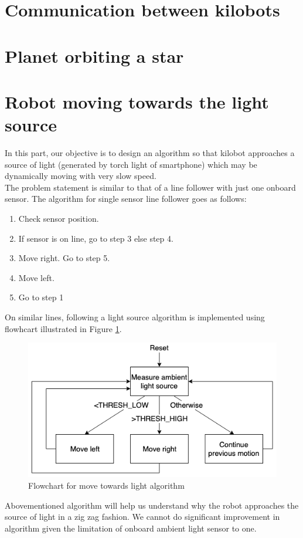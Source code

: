 \documentclass{article}
\begin{document}
\section{Communication between kilobots}

\section{Planet orbiting a star}

\section{Robot moving towards the light source}
In this part, our objective is to design an algorithm so that kilobot approaches a source of light (generated by torch light of smartphone) which may be dynamically moving with very slow speed.\\
The problem statement is similar to that of a line follower with just one onboard sensor. The algorithm for single sensor line follower goes as follows:
\begin{enumerate}
	\item Check sensor position.
	\item If sensor is on line, go to step 3 else step 4.
	\item Move right. Go to step 5.
	\item Move left.
	\item Go to step 1
\end{enumerate}
On similar lines, following a light source algorithm is implemented using flowhcart illustrated in Figure \ref{fig:move_towards_light_algorithm}.
\begin{figure}[H]
    \centering
    \includegraphics[scale=0.5]{images/move_towards_light_algorithm}
    \caption{Flowchart for move towards light algorithm}
    \label{fig:move_towards_light_algorithm}
\end{figure}
Abovementioned algorithm will help us understand why the robot approaches the source of light in a zig zag fashion. We cannot do significant improvement in algorithm given the limitation of onboard ambient light sensor to one.
\end{document}
